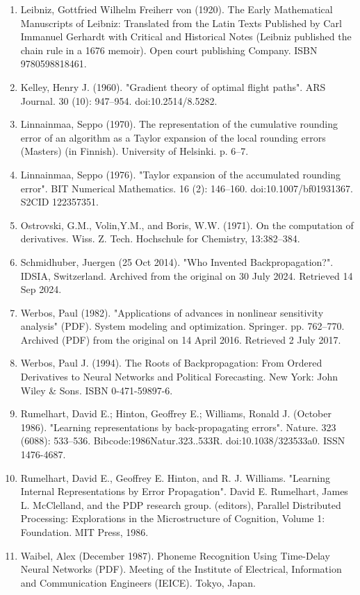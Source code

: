 \begin{enumerate}
\item Leibniz, Gottfried Wilhelm Freiherr von (1920). The Early Mathematical Manuscripts of Leibniz: Translated from the Latin Texts Published by Carl Immanuel Gerhardt with Critical and Historical Notes (Leibniz published the chain rule in a 1676 memoir). Open court publishing Company. ISBN 9780598818461.
\item Kelley, Henry J. (1960). "Gradient theory of optimal flight paths". ARS Journal. 30 (10): 947–954. doi:10.2514/8.5282.
\item Linnainmaa, Seppo (1970). The representation of the cumulative rounding error of an algorithm as a Taylor expansion of the local rounding errors (Masters) (in Finnish). University of Helsinki. p. 6–7.
\item Linnainmaa, Seppo (1976). "Taylor expansion of the accumulated rounding error". BIT Numerical Mathematics. 16 (2): 146–160. doi:10.1007/bf01931367. S2CID 122357351.
\item Ostrovski, G.M., Volin,Y.M., and Boris, W.W. (1971). On the computation of derivatives. Wiss. Z. Tech. Hochschule for Chemistry, 13:382–384.
\item Schmidhuber, Juergen (25 Oct 2014). "Who Invented Backpropagation?". IDSIA, Switzerland. Archived from the original on 30 July 2024. Retrieved 14 Sep 2024.
\item Werbos, Paul (1982). "Applications of advances in nonlinear sensitivity analysis" (PDF). System modeling and optimization. Springer. pp. 762–770. Archived (PDF) from the original on 14 April 2016. Retrieved 2 July 2017.
\item Werbos, Paul J. (1994). The Roots of Backpropagation: From Ordered Derivatives to Neural Networks and Political Forecasting. New York: John Wiley & Sons. ISBN 0-471-59897-6.
\item Rumelhart, David E.; Hinton, Geoffrey E.; Williams, Ronald J. (October 1986). "Learning representations by back-propagating errors". Nature. 323 (6088): 533–536. Bibcode:1986Natur.323..533R. doi:10.1038/323533a0. ISSN 1476-4687.
\item Rumelhart, David E., Geoffrey E. Hinton, and R. J. Williams. "Learning Internal Representations by Error Propagation". David E. Rumelhart, James L. McClelland, and the PDP research group. (editors), Parallel Distributed Processing: Explorations in the Microstructure of Cognition, Volume 1: Foundation. MIT Press, 1986.
\item Waibel, Alex (December 1987). Phoneme Recognition Using Time-Delay Neural Networks (PDF). Meeting of the Institute of Electrical, Information and Communication Engineers (IEICE). Tokyo, Japan.

\end{enumerate}

